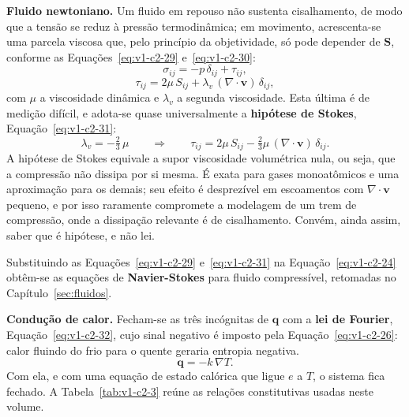 \documentclass[12pt,a4paper]{article}
\numberwithin{equation}{section}
\numberwithin{table}{section}
\numberwithin{figure}{section}
\begin{document}
\textbf{Fluido newtoniano.} Um fluido em repouso não sustenta cisalhamento, de
modo que a tensão se reduz à pressão termodinâmica; em movimento, acrescenta-se
uma parcela viscosa que, pelo princípio da objetividade, só pode depender de
$\mathbf{S}$, conforme as Equações~\eqref{eq:v1-c2-29} e~\eqref{eq:v1-c2-30}:
\begin{equation}\label{eq:v1-c2-29}
\sigma_{ij} = -p\,\delta_{ij} + \tau_{ij},
\end{equation}
\begin{equation}\label{eq:v1-c2-30}
\tau_{ij} = 2\mu\,S_{ij} + \lambda_v \,(\nabla\cdot\mathbf{v})\,\delta_{ij},
\end{equation}
com $\mu$ a viscosidade dinâmica e $\lambda_v$ a segunda viscosidade. Esta
última é de medição difícil, e adota-se quase universalmente a \textbf{hipótese
de Stokes}, Equação~\eqref{eq:v1-c2-31}:
\begin{equation}\label{eq:v1-c2-31}
\lambda_v = -\tfrac{2}{3}\,\mu
\qquad\Longrightarrow\qquad
\tau_{ij} = 2\mu\,S_{ij} - \tfrac{2}{3}\mu\,(\nabla\cdot\mathbf{v})\,\delta_{ij}.
\end{equation}
A hipótese de Stokes equivale a supor viscosidade volumétrica nula, ou seja,
que a compressão não dissipa por si mesma. É exata para gases monoatômicos e
uma aproximação para os demais; seu efeito é desprezível em escoamentos com
$\nabla\cdot\mathbf{v}$ pequeno, e por isso raramente compromete a modelagem de
um trem de compressão, onde a dissipação relevante é de cisalhamento. Convém,
ainda assim, saber que é hipótese, e não lei.

Substituindo as Equações~\eqref{eq:v1-c2-29} e~\eqref{eq:v1-c2-31} na
Equação~\eqref{eq:v1-c2-24} obtêm-se as equações de \textbf{Navier-Stokes} para
fluido compressível, retomadas no Capítulo~\ref{sec:fluidos}.

\textbf{Condução de calor.} Fecham-se as três incógnitas de $\mathbf{q}$ com a
\textbf{lei de Fourier}, Equação~\eqref{eq:v1-c2-32}, cujo sinal negativo é
imposto pela Equação~\eqref{eq:v1-c2-26}: calor fluindo do frio para o quente
geraria entropia negativa.
\begin{equation}\label{eq:v1-c2-32}
\mathbf{q} = -k\,\nabla T .
\end{equation}
Com ela, e com uma equação de estado calórica que ligue $e$ a $T$, o sistema
fica fechado. A Tabela~\ref{tab:v1-c2-3} reúne as relações constitutivas usadas
neste volume.
\end{document}
